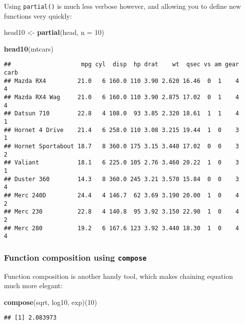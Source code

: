 \documentclass[
]{article}
\newenvironment{Shaded}{\begin{snugshade}}{\end{snugshade}}
\newcommand{\DataTypeTok}[1]{\textcolor[rgb]{0.13,0.29,0.53}{#1}}
\newcommand{\DecValTok}[1]{\textcolor[rgb]{0.00,0.00,0.81}{#1}}
\newcommand{\KeywordTok}[1]{\textcolor[rgb]{0.13,0.29,0.53}{\textbf{#1}}}
\newcommand{\NormalTok}[1]{#1}
\newcommand{\StringTok}[1]{\textcolor[rgb]{0.31,0.60,0.02}{#1}}
\begin{document}
Using \texttt{partial()} is much less verbose however, and allowing you to define new functions very quickly:

\begin{Shaded}
\begin{Highlighting}[]
\NormalTok{head10 \textless{}{-}}\StringTok{ }\KeywordTok{partial}\NormalTok{(head, }\DataTypeTok{n =} \DecValTok{10}\NormalTok{)}

\KeywordTok{head10}\NormalTok{(mtcars)}
\end{Highlighting}
\end{Shaded}

\begin{verbatim}
##                    mpg cyl  disp  hp drat    wt  qsec vs am gear carb
## Mazda RX4         21.0   6 160.0 110 3.90 2.620 16.46  0  1    4    4
## Mazda RX4 Wag     21.0   6 160.0 110 3.90 2.875 17.02  0  1    4    4
## Datsun 710        22.8   4 108.0  93 3.85 2.320 18.61  1  1    4    1
## Hornet 4 Drive    21.4   6 258.0 110 3.08 3.215 19.44  1  0    3    1
## Hornet Sportabout 18.7   8 360.0 175 3.15 3.440 17.02  0  0    3    2
## Valiant           18.1   6 225.0 105 2.76 3.460 20.22  1  0    3    1
## Duster 360        14.3   8 360.0 245 3.21 3.570 15.84  0  0    3    4
## Merc 240D         24.4   4 146.7  62 3.69 3.190 20.00  1  0    4    2
## Merc 230          22.8   4 140.8  95 3.92 3.150 22.90  1  0    4    2
## Merc 280          19.2   6 167.6 123 3.92 3.440 18.30  1  0    4    4
\end{verbatim}

\hypertarget{function-composition-using-compose}{%
\subsubsection{\texorpdfstring{Function composition using \texttt{compose}}{Function composition using compose}}\label{function-composition-using-compose}}

Function composition is another handy tool, which makes chaining equation much more elegant:

\begin{Shaded}
\begin{Highlighting}[]
\KeywordTok{compose}\NormalTok{(sqrt, log10, exp)(}\DecValTok{10}\NormalTok{)}
\end{Highlighting}
\end{Shaded}

\begin{verbatim}
## [1] 2.083973
\end{verbatim}
\end{document}
